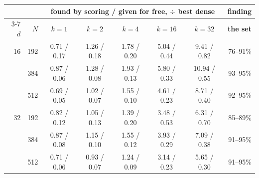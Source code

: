 \begin{tabular}{rr ccccc r}
\toprule
& & \multicolumn{5}{c}{\textbf{found by scoring / given for free}, $\div$ best dense} & \textbf{finding} \\
\cmidrule(lr){3-7}
$d$ & $N$ & $k{=}1$ & $k{=}2$ & $k{=}4$ & $k{=}16$ & $k{=}32$ & \textbf{the set} \\
\midrule
16 & 192 & 0.71 / 0.17 & 1.26 / 0.18 & 1.78 / 0.20 & 5.04 / 0.44 & 9.41 / 0.82 & 76--91\% \\
 & 384 & 0.87 / 0.06 & 1.28 / 0.08 & 1.93 / 0.13 & 5.80 / 0.33 & 10.94 / 0.55 & 93--95\% \\
 & 512 & 0.69 / 0.05 & 1.02 / 0.07 & 1.55 / 0.10 & 4.61 / 0.23 & 8.71 / 0.40 & 92--95\% \\
\midrule
32 & 192 & 0.82 / 0.12 & 1.05 / 0.13 & 1.39 / 0.20 & 3.48 / 0.53 & 6.31 / 0.70 & 85--89\% \\
 & 384 & 0.87 / 0.08 & 1.15 / 0.10 & 1.55 / 0.12 & 3.93 / 0.29 & 7.09 / 0.38 & 91--95\% \\
 & 512 & 0.71 / 0.06 & 0.93 / 0.07 & 1.24 / 0.09 & 3.14 / 0.23 & 5.65 / 0.30 & 91--95\% \\
\bottomrule
\end{tabular}%

